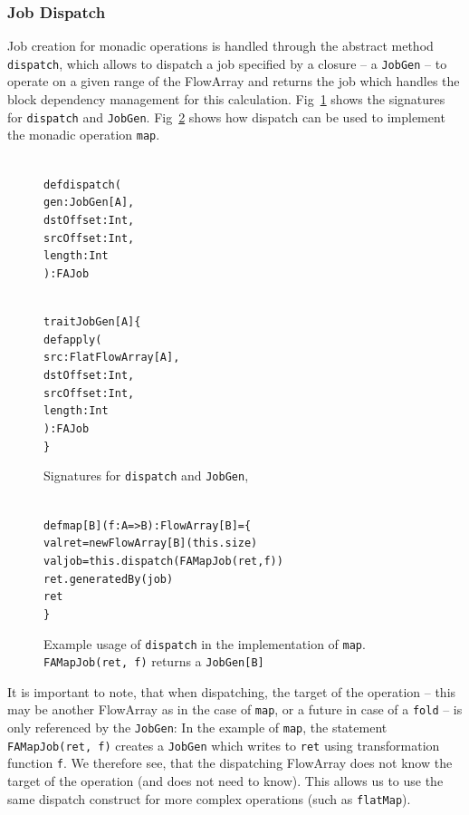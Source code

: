 \documentclass[runningheads,a4paper,fleqn]{llncs}
\begin{document}
\subsubsection{Job Dispatch}
Job creation for monadic operations is handled through the abstract
method \texttt{dispatch}, which allows to dispatch a job specified by
a closure -- a \texttt{JobGen} -- to operate on a given range of the
FlowArray and returns the job which handles the block dependency
management for this calculation. Fig~\ref{fig:dispatch-code} shows the
signatures for \texttt{dispatch} and
\texttt{JobGen}. Fig~\ref{fig:dispatch-example} shows how dispatch
can be used to implement the monadic operation \texttt{map}.

\begin{figure}
\begin{minipage}[t]{6cm}
\begin{alltt}
{\scriptsize
def dispatch(
  gen: JobGen[A],
  dstOffset: Int,
  srcOffset: Int,
  length: Int
): FAJob
}
\end{alltt}
\end{minipage}
\begin{minipage}[t]{7cm}
\begin{alltt}
{\scriptsize
trait JobGen[A] \{
  def apply(
    src: FlatFlowArray[A],
    dstOffset: Int,
    srcOffset: Int,
    length: Int
  ): FAJob
\}
}
\end{alltt}
\end{minipage}
\caption{Signatures for \texttt{dispatch} and \texttt{JobGen}, }
\label{fig:dispatch-code}
\end{figure}

\begin{figure}
\begin{alltt}
{\scriptsize
def map[B](f: A => B): FlowArray[B] = \{
    val ret = newFlowArray[B](this.size)
    val job = this.dispatch(FAMapJob(ret, f))
    ret.generatedBy(job)
    ret
\}
}
\end{alltt}
\caption{Example usage of \texttt{dispatch} in the implementation of
  \texttt{map}. \texttt{FAMapJob(ret, f)} returns a
  \texttt{JobGen[B]}}
\label{fig:dispatch-example}
\end{figure}

It is important to note, that when dispatching, the target of the
operation -- this may be another FlowArray as in the case of
\texttt{map}, or a future in case of a \texttt{fold} -- is only
referenced by the \texttt{JobGen}: In the example of 
\texttt{map}, the statement \texttt{FAMapJob(ret, f)} creates a
\texttt{JobGen} which writes to \texttt{ret} using transformation
function \texttt{f}. We therefore see, that the dispatching FlowArray
does not know the target of the operation (and does not need to
know). This allows us to use the same dispatch construct for more
complex operations (such as \texttt{flatMap}).
\end{document}
